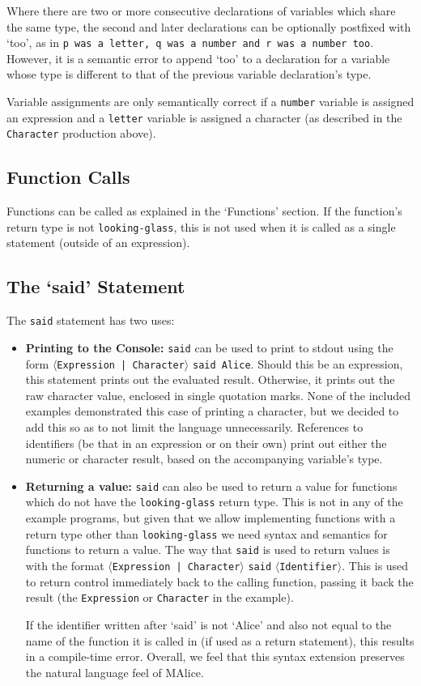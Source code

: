 \documentclass[a4wide, 11pt]{article}
\begin{document}
Where there are two or more consecutive declarations of variables which share the same type, the second and later declarations can be optionally postfixed with `too', as in \texttt{p was a letter, q was a number and r was a number too}. However, it is a semantic error to append `too' to a declaration for a variable whose type is different to that of the previous variable declaration's type.

Variable assignments are only semantically correct if a \texttt{number} variable is assigned an expression and a \texttt{letter} variable is assigned a character (as described in the \texttt{Character} production above).

\subsection{Function Calls}

Functions can be called as explained in the `Functions' section. If the function's return type is not \texttt{looking-glass}, this is not used when it is called as a single statement (outside of an expression).

\subsection{The `said' Statement}

The \texttt{said} statement has two uses:
\begin{itemize}
\item \textbf{Printing to the Console:} \texttt{said} can be used to print to stdout using the form $\langle$\texttt{Expression | Character}$\rangle$ \texttt{said Alice}. Should this be an expression, this statement prints out the evaluated result. Otherwise, it prints out the raw character value, enclosed in single quotation marks. None of the included examples demonstrated this case of printing a character, but we decided to add this so as to not limit the language unnecessarily. References to identifiers (be that in an expression or on their own) print out either the numeric or character result, based on the accompanying variable's type.
\item \textbf{Returning a value:} \texttt{said} can also be used to return a value for functions which do not have the \texttt{looking-glass} return type. This is not in any of the example programs, but given that we allow implementing functions with a return type other than \texttt{looking-glass} we need syntax and semantics for functions to return a value. The way that \texttt{said} is used to return values is with the format $\langle$\texttt{Expression | Character}$\rangle$ \texttt{said} $\langle$\texttt{Identifier}$\rangle$. This is used to return control immediately back to the calling function, passing it back the result (the \texttt{Expression} or \texttt{Character} in the example).

If the identifier written after `said' is not `Alice' and also not equal to the name of the function it is called in (if used as a return statement), this results in a compile-time error. Overall, we feel that this syntax extension preserves the natural language feel of MAlice.
\end{itemize}
\end{document}
